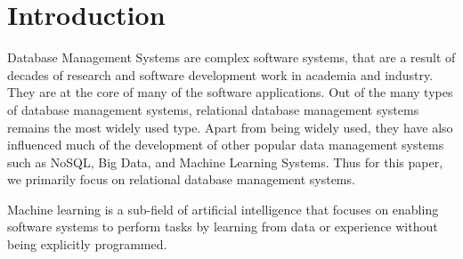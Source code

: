 \section{Introduction}

Database Management Systems are complex software systems, that are a result of decades of research and software development work in academia and industry.
They are at the core of many of the software applications.
Out of the many types of database management systems, relational database management systems remains the most widely used type.
Apart from being widely used, they have also influenced much of the development of other popular data management systems such as NoSQL, Big Data, and Machine Learning Systems.
Thus for this paper, we primarily focus on relational database management systems.

Machine learning is a sub-field of artificial intelligence that focuses on enabling software systems to perform tasks by learning from data or experience without being explicitly programmed.


